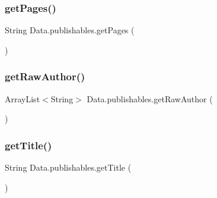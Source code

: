 \hypertarget{class_data_1_1publishables_af657673a106cc994008f104f62f639ba}{}\label{class_data_1_1publishables_af657673a106cc994008f104f62f639ba} 
\subsubsection{\texorpdfstring{get\+Pages()}{getPages()}}
{\footnotesize\ttfamily String Data.\+publishables.\+get\+Pages (\begin{DoxyParamCaption}{ }\end{DoxyParamCaption})}

\hypertarget{class_data_1_1publishables_a309ee4a6e0475636adf30390f9edfb10}{}\label{class_data_1_1publishables_a309ee4a6e0475636adf30390f9edfb10} 
\subsubsection{\texorpdfstring{get\+Raw\+Author()}{getRawAuthor()}}
{\footnotesize\ttfamily Array\+List$<$String$>$ Data.\+publishables.\+get\+Raw\+Author (\begin{DoxyParamCaption}{ }\end{DoxyParamCaption})}

\hypertarget{class_data_1_1publishables_a8b14020ff568a02776ffe674eac0fcba}{}\label{class_data_1_1publishables_a8b14020ff568a02776ffe674eac0fcba} 
\subsubsection{\texorpdfstring{get\+Title()}{getTitle()}}
{\footnotesize\ttfamily String Data.\+publishables.\+get\+Title (\begin{DoxyParamCaption}{ }\end{DoxyParamCaption})}

\hypertarget{class_data_1_1publishables_a8e829e500e2f0aa65e57c344cc1afb7c}{}\label{class_data_1_1publishables_a8e829e500e2f0aa65e57c344cc1afb7c} 
